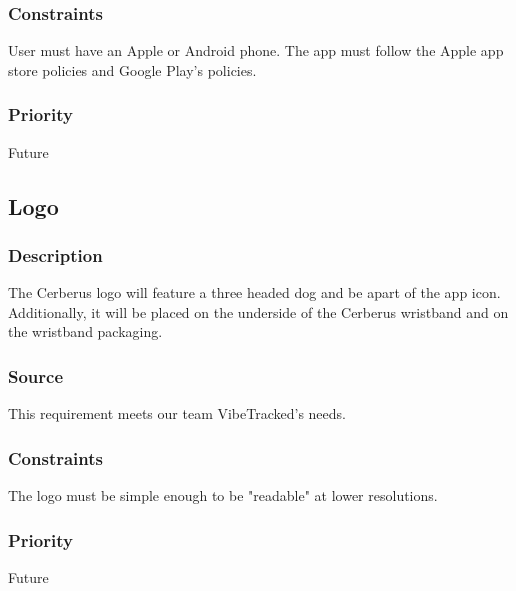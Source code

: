 \subsubsection{Constraints}
User must have an Apple or Android phone. The app must follow the Apple app store policies and Google Play's policies.
\subsubsection{Priority}
Future

\subsection{Logo}
\subsubsection{Description}
The Cerberus logo will feature a three headed dog and be apart of the app icon. Additionally, it will be placed on the underside of the Cerberus wristband and on the wristband packaging.
\subsubsection{Source}
This requirement meets our team VibeTracked's needs.
\subsubsection{Constraints}
The logo must be simple enough to be "readable" at lower resolutions.
\subsubsection{Priority}
Future